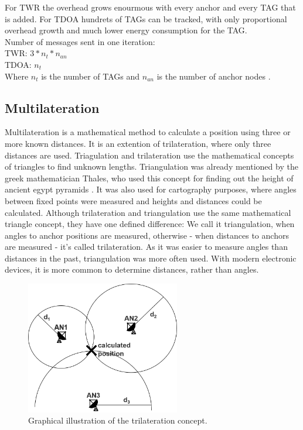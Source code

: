 \noindent\hspace*{5mm}%
For TWR the overhead grows enourmous with every anchor and every TAG that is added. For TDOA hundrets of TAGs can be tracked, with only proportional overhead growth and much lower energy consumption for the TAG.\\
Number of messages sent in one iteration:\\
TWR:  $3 * n_{t} * n_{an}$\\
TDOA:  $n_{t}$\\
Where $n_{t}$ is the number of TAGs and $n_{an}$ is the number of anchor nodes \cite{SewioTDOA}.

\subsection{Multilateration}
Multilateration is a mathematical method to calculate a position using three or more known distances. It is an extention of trilateration, where only three distances are used. Triagulation and trilateration use the mathematical concepts of triangles to find unknown lengths. Triangulation was already mentioned by the greek mathematician Thales, who used this concept for finding out the height of ancient egypt pyramids \cite{thales}. It was also used for cartography purposes, where angles between fixed points were measured and heights and distances could be calculated. 
Although trilateration and triangulation use the same mathematical triangle concept, they have one defined difference: We call it triangulation, when angles to anchor positions are measured, otherwise - when distances to anchors are measured - it's called trilateration.
As it was easier to measure angles than distances in the past, triangulation was more often used. With modern electronic devices, it is more common to determine distances, rather than angles. 

\begin{figure}[th]
\centering
\includegraphics[width=0.6\textwidth]{Figures/trilateration}
\decoRule
\caption[Trilateration]{Graphical illustration of the trilateration concept.}
\label{fig:trilateration}
\end{figure}

